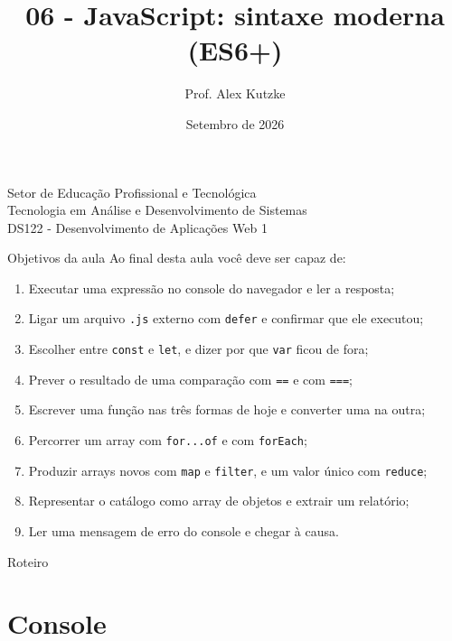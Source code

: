 \documentclass{beamer}
\title{06 - JavaScript: sintaxe moderna (ES6+)}
\author{Prof. Alex Kutzke}
\date{Setembro de 2026}
\begin{document}
\begin{frame}
	\begin{center}
		\large{Setor de Educação Profissional e Tecnológica}\\
		Tecnologia em Análise e Desenvolvimento de Sistemas\\
		\vspace{1cm}
		\small{DS122 - Desenvolvimento de Aplicações Web 1}
	\end{center}
	\titlepage
\end{frame}

\begin{frame}{Objetivos da aula}
	Ao final desta aula você deve ser capaz de:
	\begin{enumerate}
		\item Executar uma expressão no console do navegador e ler a resposta;
		\item Ligar um arquivo \texttt{.js} externo com \texttt{defer} e confirmar
		      que ele executou;
		\item Escolher entre \texttt{const} e \texttt{let}, e dizer por que
		      \texttt{var} ficou de fora;
		\item Prever o resultado de uma comparação com \texttt{==} e com
		      \texttt{===};
		\item Escrever uma função nas três formas de hoje e converter uma na outra;
		\item Percorrer um array com \texttt{for...of} e com \texttt{forEach};
		\item Produzir arrays novos com \texttt{map} e \texttt{filter}, e um valor
		      único com \texttt{reduce};
		\item Representar o catálogo como array de objetos e extrair um relatório;
		\item Ler uma mensagem de erro do console e chegar à causa.
	\end{enumerate}
\end{frame}

\begin{frame}{Roteiro}
	\tableofcontents
\end{frame}

\section{Console}
\end{document}
